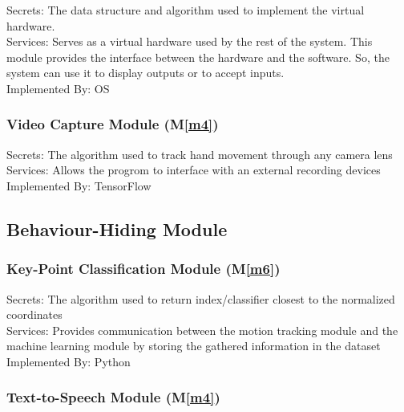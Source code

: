\documentclass[12pt, titlepage]{article}
\newcommand{\mref}[1]{M\ref{#1}}
\begin{document}
\begin{description}
  \item[Secrets: The data structure and algorithm used to implement the virtual hardware.]
  \item[Services: Serves as a virtual hardware used by the rest of the system. This module provides the interface between the hardware and the software. So, the system can use it to display outputs or to accept inputs.] 
  \item[Implemented By: OS] 
  \end{description}
  
\subsubsection{Video Capture Module (\mref{m4})}

\begin{description}
  \item[Secrets: The algorithm used to track hand movement through any camera lens]
  \item[Services: Allows the progrom to interface with an external recording devices] 
  \item[Implemented By: TensorFlow] 
  \end{description}

\subsection{Behaviour-Hiding Module}

\subsubsection{Key-Point Classification Module (\mref{m6})}

\begin{description}
  \item[Secrets: The algorithm used to return index/classifier closest to the normalized coordinates]
  \item[Services: Provides communication between the motion tracking module and the machine learning module by storing the gathered information in the dataset] 
  \item[Implemented By: Python] 
  \end{description}

\subsubsection{Text-to-Speech Module (\mref{m4})}
\end{document}
